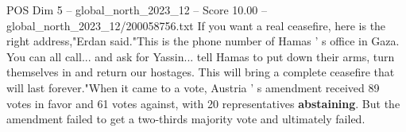 \begin{textsample}{POS Dim 5 – global\_north\_2023\_12 – Score 10.00 – global\_north\_2023\_12/200058756.txt}
If you want a real ceasefire, here is the right address,"Erdan said."This is the phone number of Hamas ' s office in Gaza.
You can all call... and ask for Yassin... tell Hamas to put down their arms, turn themselves in and return our hostages.
This will bring a complete ceasefire that will last forever."When it came to a vote, Austria ' s amendment received 89 votes in favor and 61 votes against, with 20 representatives \textbf{abstaining}.
But the amendment failed to get a two-thirds majority vote and ultimately failed.

\end{textsample}
